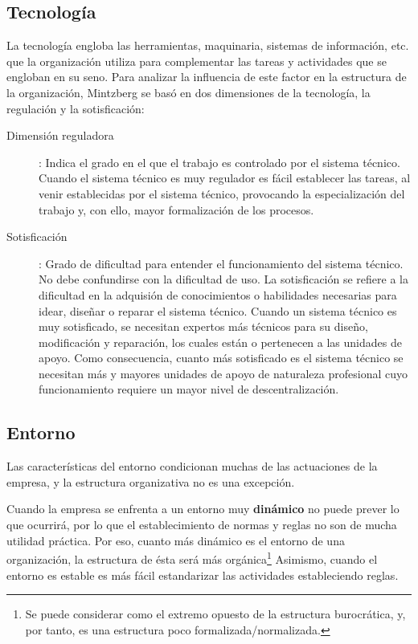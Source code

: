 \documentclass[12pt,a4paper,spanish]{report}
\begin{document}
		\subsection*{\textcolor[rgb]{0.5,0.1,0.4}Tecnología}
			La tecnología engloba las herramientas, maquinaria, sistemas de información, etc. que la organización utiliza para complementar las tareas y actividades que se engloban en su seno. Para analizar la influencia de este factor en la estructura de la organización, Mintzberg se basó en dos dimensiones de la tecnología, la regulación y la sotisficación:
			\begin{description}
				\item[Dimensión reguladora]: Indica el grado en el que el trabajo es controlado por el sistema técnico. Cuando el sistema técnico es muy regulador es fácil establecer las tareas, al venir establecidas por el sistema técnico, provocando la especialización del trabajo y, con ello, mayor formalización de los procesos.

				\item[Sotisficación]: Grado de dificultad para entender el funcionamiento del sistema técnico. No debe confundirse con la dificultad de uso. La sotisficación se refiere a la dificultad en la adquisión de conocimientos o habilidades necesarias para idear, diseñar o reparar el sistema técnico. Cuando un sistema técnico es muy sotisficado, se necesitan expertos más técnicos para su diseño, modificación y reparación, los cuales están o pertenecen a las unidades de apoyo. Como consecuencia, cuanto más sotisficado es el sistema técnico se necesitan más y mayores unidades de apoyo de naturaleza profesional cuyo funcionamiento requiere un mayor nivel de descentralización.
			\end{description}

		\subsection*{\textcolor[rgb]{0.5,0.1,0.4}Entorno}
			Las características del entorno condicionan muchas de las actuaciones de la empresa, y la estructura organizativa no es una excepción.

			Cuando la empresa se enfrenta a un entorno muy \textbf{dinámico} no puede prever lo que ocurrirá, por lo que el establecimiento de normas y reglas no son de mucha utilidad práctica.  Por eso, cuanto más dinámico es el entorno de una organización, la estructura de ésta será más orgánica\footnote{Se puede considerar como el extremo opuesto de la estructura burocrática, y, por tanto, es una estructura poco formalizada/normalizada.} Asimismo, cuando el entorno es estable es más fácil estandarizar las actividades estableciendo reglas.
\end{document}
